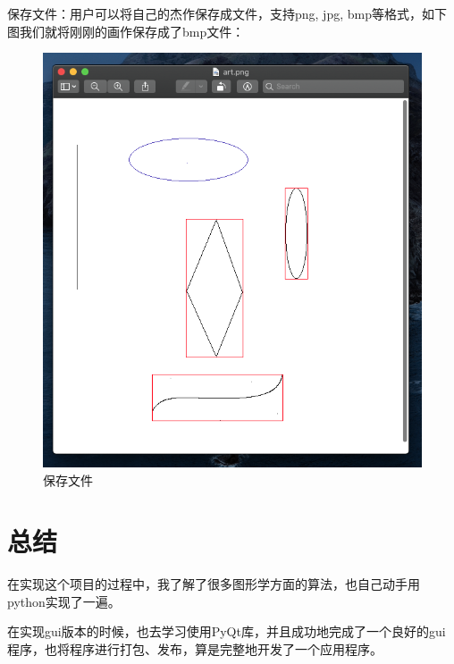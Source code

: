 \documentclass[a4paper,UTF8]{article}
\theoremstyle{definition}
\begin{document}
保存文件：用户可以将自己的杰作保存成文件，支持png, jpg, bmp等格式，如下图我们就将刚刚的画作保存成了bmp文件：

\begin{figure}[H]
    \centering
    \includegraphics[scale=0.4]{save.png}
    \caption{保存文件}
\end{figure}


\section{总结}

在实现这个项目的过程中，我了解了很多图形学方面的算法，也自己动手用python实现了一遍。

在实现gui版本的时候，也去学习使用PyQt库，并且成功地完成了一个良好的gui程序，也将程序进行打包、发布，算是完整地开发了一个应用程序。

\newpage

%

\end{document}
